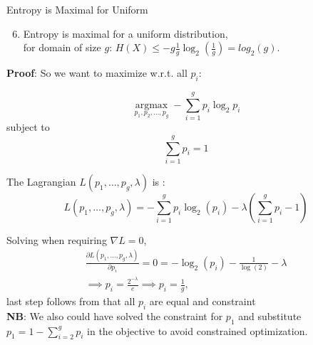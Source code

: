 \documentclass[11pt,compress,t,notes=noshow, xcolor=table]{beamer}
\begin{document}
\begin{vbframe}{Entropy is Maximal for Uniform}
\begin{enumerate}
\setcounter{enumi}{5}
\item Entropy is maximal for a uniform distribution,\\
      for domain of size $g$:  
      $H(X) \leq -g\frac{1}{g} \log_2(\frac{1}{g}) = log_2(g)$.
\end{enumerate}
\vspace{0.2cm}

\lz
\textbf{Proof}: 
So we want to maximize w.r.t. all $p_i$:

  $$\underset{p_{1}, p_{2}, \ldots, p_{g}}{\operatorname{argmax}} -\sum_{i=1}^{g} p_{i} \log _{2} p_{i}$$
  subject to
  $$\sum_{i=1}^g p_i = 1$$
  
  \framebreak
  The Lagrangian $L(p_1, \ldots, p_g, \lambda)$ is :
  $$L(p_1, \ldots, p_g, \lambda) = - \sum_{i=1}^g p_i \log_2(p_i) - \lambda \left( \sum_{i=1}^g p_i - 1 \right)$$
  
  Solving when requiring $\nabla L = 0$,
  \begin{gather*}
    \frac{\partial L(p_1, \ldots, p_g, \lambda)}{\partial p_i} = 0 = - \log_2(p_i) - \frac{1}{\log(2)} - \lambda \\
    \implies p_i = \frac{2^{- \lambda}}{e} \implies p_i = \frac{1}{g},
  \end{gather*}
  last step follows from that all $p_i$ are equal and constraint
  \vspace{0.2cm}\\
  \textbf{NB}: We also could have solved the constraint for $p_1$ and substitute $p_1=1-\sum_{i=2}^{g} p_i$ in the objective to avoid constrained optimization.

\end{vbframe}

\endlecture
\end{document}
